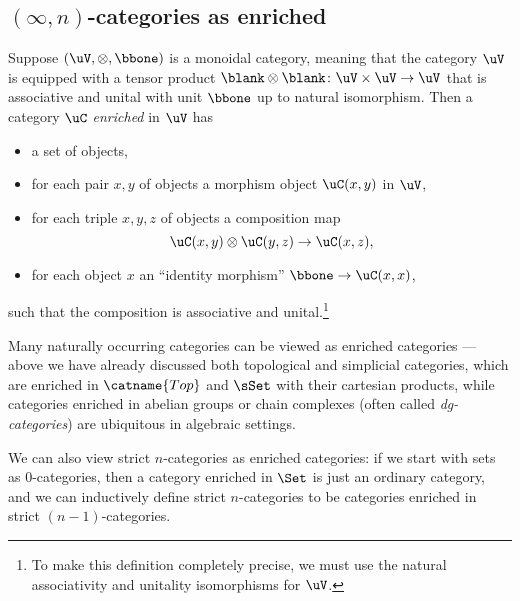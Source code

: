 \documentclass[a4paper,12pt]{article}
\renewcommand{\Top}{\catname{Top}}
\begin{document}
\subsection{$(\infty,n)$-categories as enriched \icats{}}\label{subsec:enr}
Suppose $(\uV, \otimes, \bbone)$ is a monoidal category, meaning that
the category $\uV$ is equipped with
a tensor product $\blank \otimes \blank \colon \uV \times \uV \to \uV$
that is associative and unital with unit $\bbone$ up to natural
isomorphism. Then a category $\uC$ \emph{enriched} in $\uV$ has
\begin{itemize}
\item a set of objects,
\item for each pair $x,y$ of objects a morphism object $\uC(x,y)$ in
  $\uV$,
\item for each triple $x,y,z$ of objects a composition map
  \[ \uC(x,y) \otimes \uC(y,z) \to \uC(x,z), \]
\item for each object $x$ an ``identity morphism'' $\bbone \to
  \uC(x,x)$,
\end{itemize}
such that the composition is associative and unital.\footnote{To make
  this definition completely precise, we must use the natural associativity and
  unitality isomorphisms for $\uV$.}

Many naturally occurring categories can be viewed as enriched
categories --- above we have already discussed both topological and
simplicial categories, which are enriched in $\Top$ and $\sSet$ with
their cartesian products, while categories enriched in abelian groups
or chain complexes (often called \emph{dg-categories}) are ubiquitous
in algebraic settings.

We can
also view strict $n$-categories as enriched categories: if we start
with sets as $0$-categories, then a category enriched in $\Set$ is
just an ordinary category, and we can inductively define strict
$n$-categories to be categories enriched in strict $(n-1)$-categories.
\end{document}
